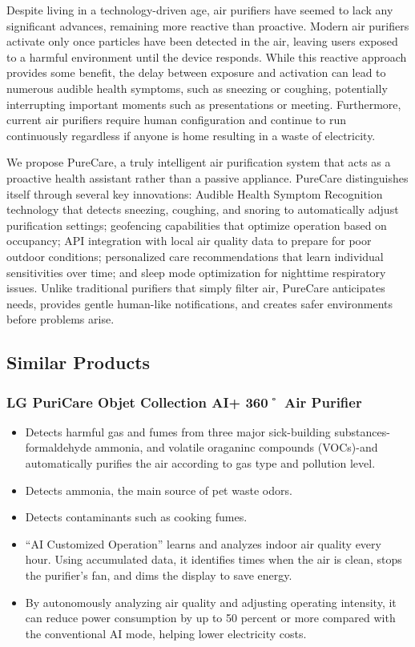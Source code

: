 \documentclass[conference]{IEEEtran}
\begin{document}
Despite living in a technology-driven age, air purifiers have seemed to lack any significant advances, remaining more reactive than proactive. Modern air purifiers activate only once particles have been detected in the air, leaving users exposed to a harmful environment until the device responds. While this reactive approach provides some benefit, the delay between exposure and activation can lead to numerous audible health symptoms, such as sneezing or coughing, potentially interrupting important moments such as presentations or meeting. Furthermore, current air purifiers require human configuration and continue to run continuously regardless if anyone is home resulting in a waste of electricity.

We propose PureCare, a truly intelligent air purification system that acts as a proactive health assistant rather than a passive appliance. PureCare distinguishes itself through several key innovations: Audible Health Symptom Recognition technology that detects sneezing, coughing, and snoring to automatically adjust purification settings; geofencing capabilities that optimize operation based on occupancy; API integration with local air quality data to prepare for poor outdoor conditions; personalized care recommendations that learn individual sensitivities over time; and sleep mode optimization for nighttime respiratory issues. Unlike traditional purifiers that simply filter air, PureCare anticipates needs, provides gentle human-like notifications, and creates safer environments before problems arise.
\newpage
\subsection{Similar Products}
    \subsubsection{LG PuriCare Objet Collection AI+ 360˚ Air Purifier}
        \begin{itemize}
            \item Detects harmful gas and fumes from three major sick-building substances-formaldehyde ammonia, and volatile oraganinc compounds (VOCs)-and automatically purifies the air according to gas type and pollution level.
            \item Detects ammonia, the main source of pet waste odors.
            \item Detects contaminants such as cooking fumes.
            \item “AI Customized Operation” learns and analyzes indoor air quality every hour. Using accumulated data, it identifies times when the air is clean, stops the purifier’s fan, and dims the display to save energy.
            \item By autonomously analyzing air quality and adjusting operating intensity, it can reduce power consumption by up to 50 percent or more compared with the conventional AI mode, helping lower electricity costs.
        \end{itemize}
\end{document}
